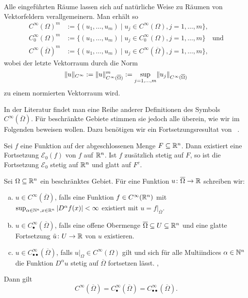 Alle eingeführten Räume lassen sich auf natürliche Weise zu Räumen von Vektor\-feldern verallgemeinern.
Man erhält so
\begin{align*}
  C^\infty(\Omega)^m &:= \{(u_1,\dots,u_m) \mid u_j \in C^\infty(\Omega), j = 1,\dots,m\}, \\
  C_0^\infty(\Omega)^m &:= \{(u_1,\dots,u_m) \mid u_j \in C_0^\infty(\Omega), j = 1,\dots,m\} \quad\text{und} \\
  C^\infty(\overline\Omega)^m &:= \{(u_1,\dots,u_m) \mid u_j \in C^\infty(\overline\Omega), j = 1,\dots,m\},
\end{align*}
wobei der letzte Vektorraum durch die Norm
$$
\lVert u \rVert_{C^\infty} := \lVert u \rVert_{C^\infty(\overline\Omega)}^m := \sup_{j = 1,\dots, m} \lVert u_j \rVert_{C^\infty(\overline\Omega)}
$$
zu einem normierten Vektorraum wird.

In der Literatur findet man eine Reihe anderer Definitionen des Symbols $C^\infty(\overline\Omega)$.
Für beschränkte Gebiete stimmen sie jedoch alle überein, wie wir im Folgenden beweisen wollen.
Dazu benötigen wir ein Fortsetzungsresultat von \stein\ \cite[S.172, Proposition 2.2]{stein1970singular}.

\begin{prop}
  \label{prop:stein}
  Sei $f$ eine Funktion auf der abgeschlossenen Menge $F \subseteq \mathbb{R}^n$.
  Dann existiert eine Fortsetzung $\mathcal{E}_0(f)$ von $f$ auf $\mathbb{R}^n$.
  Ist $f$ zusätzlich stetig auf $F$, so ist die Fortsetzung $\mathcal{E}_0$ stetig auf $\mathbb{R}^n$ und glatt auf $F^c$.
\end{prop}

\newpage
\begin{lem}
  \label{lem:CInftyClosedOmega}
  Sei $\Omega \subseteq \mathbb{R}^n$ ein beschränktes Gebiet.
  Für eine Funktion $u \colon \overline\Omega \to \mathbb{R}$ schreiben wir:
  \begin{enumerate}[(a)]
    \item $u \in C^\infty(\overline\Omega)$,
      falls eine Funktion $f \in C^\infty(\mathbb{R}^n)$ mit $\sup_{\alpha \in \mathbb{N}^n, x \in \mathbb{R}^n} | D^\alpha f(x) | <  \infty$ existiert mit $u = f|_{\overline\Omega}$. \cite[S.23, I.3.1]{sohr2001navier}

    \item $u \in C^\infty_{\bullet}(\overline\Omega)$,
      falls eine offene Obermenge $\overline\Omega \subseteq U \subseteq \mathbb{R}^n$ und eine glatte Fortsetzung $\tilde u \colon U \to \mathbb{R}$ von $u$ existieren.

    \item $ u \in C^\infty_{\bullet\bullet}(\overline\Omega)$,
    falls $u|_\Omega \in C^\infty(\Omega)$ gilt und sich für alle Multiindices $\alpha \in \mathbb{N}^n$ die Funktion $D^\alpha u$ stetig auf $\overline\Omega$ fortsetzen lässt. \cite[S.10, 1.28]{adams2003sobolev}, \cite[S.35, II.1.3]{galdi2011navier}
  \end{enumerate}

  Dann gilt
  $$
    C^\infty(\overline\Omega) =
    C^\infty_{\bullet}(\overline\Omega) =
    C^\infty_{\bullet\bullet}(\overline\Omega).
  $$
\end{lem}

